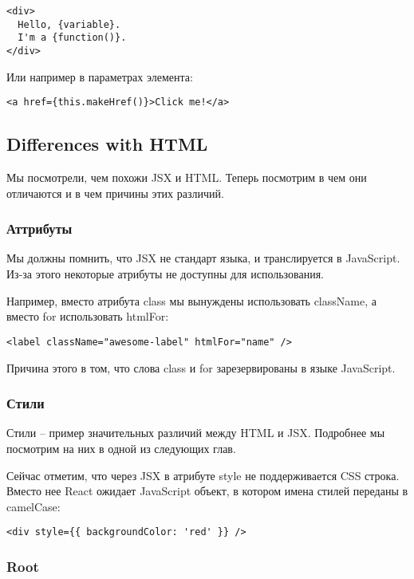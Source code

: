 \begin{lstlisting}
<div>
  Hello, {variable}.
  I'm a {function()}.
</div>	
\end{lstlisting}


Или например в параметрах элемента:

\begin{lstlisting}
<a href={this.makeHref()}>Click me!</a>
\end{lstlisting}

\subsection{Differences with HTML}

Мы посмотрели, чем похожи JSX и HTML. Теперь посмотрим в чем они отличаются и в чем причины этих различий.

\subsubsection{Аттрибуты}

Мы должны помнить, что JSX не стандарт языка, и транслируется в JavaScript. Из-за этого некоторые атрибуты не доступны для использования.

Например, вместо атрибута class мы вынуждены использовать className, а вместо for использовать htmlFor:

\begin{lstlisting}
<label className="awesome-label" htmlFor="name" />
\end{lstlisting}

Причина этого в том, что слова class и for зарезервированы в языке JavaScript.

\subsubsection{Стили}

Стили -- пример значительных различий между HTML и JSX. Подробнее мы посмотрим на них в одной из следующих глав. 

Сейчас отметим, что через JSX в атрибуте style не поддерживается CSS строка. Вместо нее React ожидает JavaScript объект, в котором имена стилей переданы в camelCase:

\begin{lstlisting}
<div style={{ backgroundColor: 'red' }} />
\end{lstlisting}

\subsubsection{Root}

